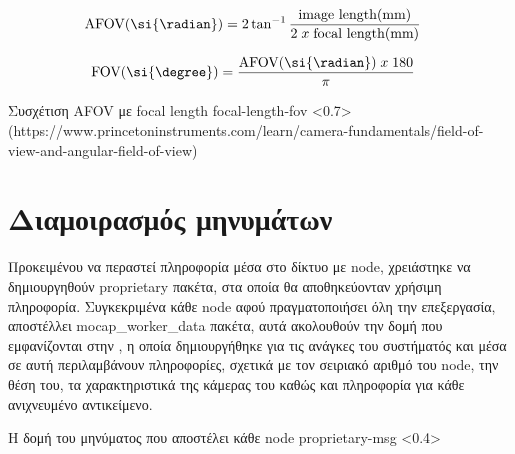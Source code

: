 \begin{align}
	\textrm{AFOV(\si{\radian})} &= 2\tan^{-1}{\frac{\textrm{image length(mm)}}{2\; x\;\textrm{focal length(mm)}}} \label{eq:afov-focal-length}
\end{align}

\begin{align}
	\textrm{FOV(\si{\degree})} &= \frac{\textrm{AFOV(\si{\radian})}\; x\;\textrm{180}}{\pi} \label{eq:afov-to-fov}
\end{align}

{Συσχέτιση AFOV με focal length} %
{focal-length-fov} %
<0.7>
(https://www.princetoninstruments.com/learn/camera-fundamentals/field-of-view-and-angular-field-of-view)

\section{Διαμοιρασμός μηνυμάτων}
Προκειμένου να περαστεί πληροφορία μέσα στο δίκτυο με node, χρειάστηκε να δημιουργηθούν proprietary πακέτα, στα οποία θα αποθηκεύονταν χρήσιμη πληροφορία. Συγκεκριμένα κάθε node αφού πραγματοποιήσει όλη την επεξεργασία, αποστέλλει mocap\_worker\_data πακέτα, αυτά ακολουθούν την δομή που εμφανίζονται στην , η οποία δημιουργήθηκε για τις ανάγκες του συστήματός και μέσα σε αυτή περιλαμβάνουν πληροφορίες, σχετικά με τον σειριακό αριθμό του node, την θέση του, τα χαρακτηριστικά της κάμερας του καθώς και πληροφορία για κάθε ανιχνευμένο αντικείμενο. 

{Η δομή του μηνύματος που αποστέλει κάθε node} %
{proprietary-msg} %
<0.4>

